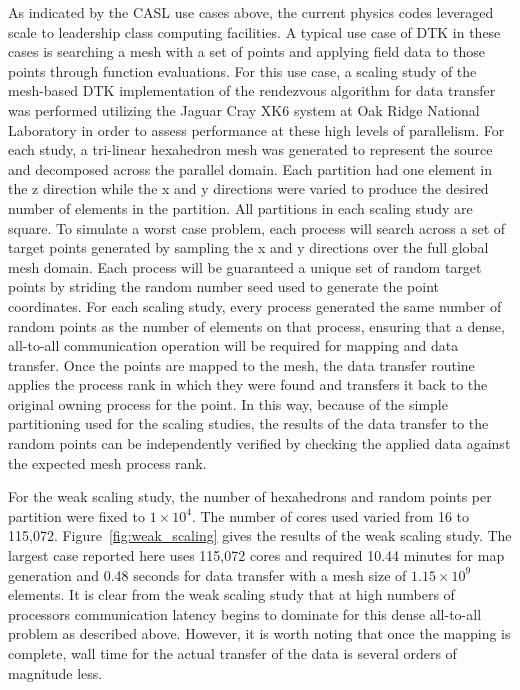 \documentclass{mc2013}
\begin{document}
\label{sec:scaling_study}

As indicated by the CASL use cases above, the current physics codes
leveraged scale to leadership class computing facilities. A typical
use case of DTK in these cases is searching a mesh with a set of
points and applying field data to those points through function
evaluations. For this use case, a scaling study of the mesh-based DTK
implementation of the rendezvous algorithm for data transfer was
performed utilizing the Jaguar Cray XK6 system at Oak Ridge National
Laboratory in order to assess performance at these high levels of
parallelism. For each study, a tri-linear hexahedron mesh was
generated to represent the source and decomposed across the parallel
domain. Each partition had one element in the z direction while the x
and y directions were varied to produce the desired number of elements
in the partition. All partitions in each scaling study are square.  To
simulate a worst case problem, each process will search across a set
of target points generated by sampling the x and y directions over the
full global mesh domain.  Each process will be guaranteed a unique set
of random target points by striding the random number seed used to
generate the point coordinates. For each scaling study, every process
generated the same number of random points as the number of elements
on that process, ensuring that a dense, all-to-all communication
operation will be required for mapping and data transfer. Once the
points are mapped to the mesh, the data transfer routine applies the
process rank in which they were found and transfers it back to the
original owning process for the point. In this way, because of the
simple partitioning used for the scaling studies, the results of the
data transfer to the random points can be independently verified by
checking the applied data against the expected mesh process rank.

\label{subsec:weak_scaling}
For the weak scaling study, the number of hexahedrons and random
points per partition were fixed to $1 \times 10^4$. The number of
cores used varied from 16 to 115,072. Figure~\ref{fig:weak_scaling}
gives the results of the weak scaling study. The largest case reported
here uses 115,072 cores and required 10.44 minutes for map generation
and 0.48 seconds for data transfer with a mesh size of $1.15 \times
10^9$ elements. It is clear from the weak scaling study that at high
numbers of processors communication latency begins to dominate for
this dense all-to-all problem as described above. However, it is worth
noting that once the mapping is complete, wall time for the actual
transfer of the data is several orders of magnitude less.
\end{document}
